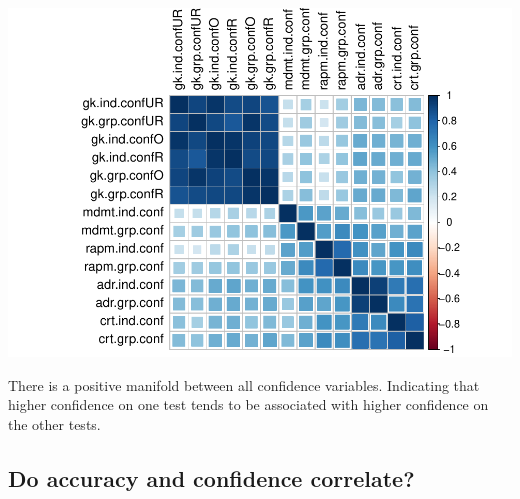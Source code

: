 \documentclass[]{article}
\begin{document}
\includegraphics{corr_analyses_files/figure-latex/confidence2-1.pdf}

There is a positive manifold between all confidence variables.
Indicating that higher confidence on one test tends to be associated
with higher confidence on the other tests.

\subsection{Do accuracy and confidence
correlate?}\label{do-accuracy-and-confidence-correlate}
\end{document}
